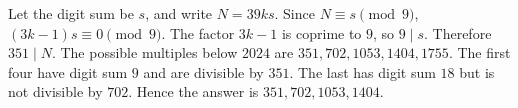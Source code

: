 Let the digit sum be $s$, and write $N=39ks$. Since $N\equiv s\pmod9$, $(3k-1)s\equiv0\pmod9$. The factor $3k-1$ is coprime to $9$, so $9\mid s$. Therefore $351\mid N$. The possible multiples below $2024$ are $351,702,1053,1404,1755$. The first four have digit sum $9$ and are divisible by $351$. The last has digit sum $18$ but is not divisible by $702$. Hence the answer is $\boxed{351,702,1053,1404}$.
